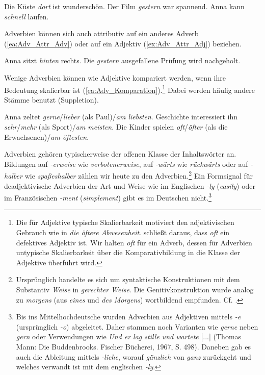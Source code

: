 \ea \label{ea:Adverb_Attribut}
\ea \label{ea:Adv_Attr_lok} Die Küste \textit{dort} ist wunderschön.
\ex \label{ex:Adv_Attr_temp} Der Film \textit{gestern} war spannend.
\ex \label{ex:Adj_Adverbial} Anna kann \textit{schnell} laufen.
\z 
\z 

Adverbien können sich auch attributiv auf ein anderes Adverb (\ref{ea:Adv_Attr_Adv}) oder auf ein Adjektiv (\ref{ex:Adv_Attr_Adj}) beziehen.

\ea \label{ea:Adverb_Attribut_Adv_Adj}
\ea \label{ea:Adv_Attr_Adv} Anna sitzt \textit{hinten} rechts.
\ex \label{ex:Adv_Attr_Adj} Die \textit{gestern} ausgefallene Prüfung wird nachgeholt.
\z 
\z 

Wenige Adverbien können wie Adjektive kompariert werden, wenn ihre Bedeutung skalierbar ist (\ref{ea:Adv_Komparation}).\footnote{Die für Adjektive typische Skalierbarkeit motiviert den adjektivischen Gebrauch wie in \textit{die öftere Abwesenheit}. \citet[212]{Geuder2019} schließt daraus, dass \textit{oft} ein defektives Adjektiv ist. Wir halten \textit{oft} für ein Adverb, dessen für Adverbien untypische Skalierbarkeit über die Komparativbildung in die Klasse der Adjektive überführt wird.} Dabei werden häufig andere Stämme benutzt (Suppletion).

\ea \label{ea:Adv_Komparation}
\ea \label{ea:gerne_lieber} Anna zeltet \textit{gerne}/\textit{lieber} (als Paul)/\textit{am liebsten}. 
\ex \label{ex:sehr_mehr} Geschichte interessiert ihn \textit{sehr}/\textit{mehr} (als Sport)/\textit{am meisten}.   
\ex \label{ex:oft_öfter} Die Kinder spielen \textit{oft}/\textit{öfter} (als die Erwachsenen)/\textit{am öftesten}.
\z 
\z 
 
Adverbien gehören typischerweise der offenen Klasse der Inhaltswörter an. Bildungen auf \textit{-erweise} wie \textit{verbotenerweise}, auf \textit{-wärts} wie \textit{rückwärts} oder auf \textit{-halber} wie \textit{spaßeshalber} zählen wir heute zu den Adverbien.\footnote{Ursprünglich handelte es sich um syntaktische Konstruktionen \zB mit dem Substantiv \textit{Weise} in \textit{gerechter Weise}. Die Genitivkonstruktion wurde analog zu \textit{morgens} (aus \textit{eines} und \textit{des Morgens}) wortbildend empfunden. Cf. \citet[621, 626--627]{Wilmanns1896Wb}.} Ein Formsignal für deadjektivische Adverbien der Art und Weise wie im Englischen \textit{-ly} (\textit{easily}) oder im Französischen \textit{-ment} (\textit{simplement}) gibt es im Deutschen nicht.\footnote{Bis ins Mittelhochdeutsche wurden Adverbien aus Adjektiven mittels \textit{-e} (ursprünglich \textit{-o}) abgeleitet. Daher stammen noch Varianten wie \textit{gerne} neben \textit{gern} oder Verwendungen wie \textit{Und er lag stille und wartete} [...] (Thomas Mann: Die Buddenbrooks. Fischer Bücherei, 1967, S. 498). Daneben gab es auch die Ableitung mittels \textit{-lîche}, worauf \zB \textit{gänzlich} von \textit{ganz} zurückgeht und welches verwandt ist mit dem englischen \textit{-ly}.}

